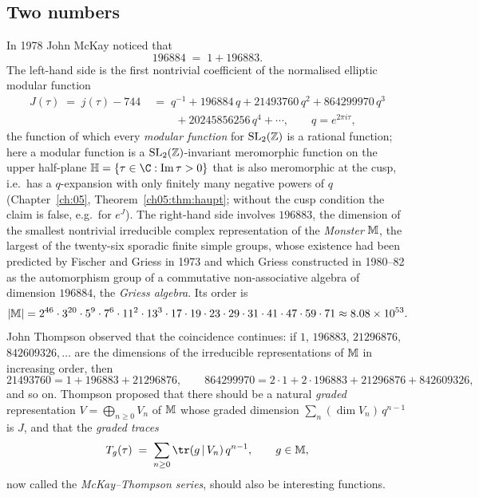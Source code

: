 \subsection{Two numbers}

In 1978 John McKay noticed that
\begin{equation}\label{ch16:eq:mckay}
  196884 \;=\; 1 + 196883 .
\end{equation}
The left-hand side is the first nontrivial coefficient of the normalised elliptic modular function
\begin{equation}\label{ch16:eq:J}
\begin{aligned}
  J(\tau) \;=\; j(\tau)-744 \;&=\; q^{-1} + 196884\,q + 21493760\,q^2 + 864299970\,q^3\\
  &\qquad + 20245856256\,q^4+\cdots,\qquad q=e^{2\pi i\tau},
\end{aligned}
\end{equation}
the function of which every \emph{modular function} for $\mathrm{SL}_2(\mathbb{Z})$ is a rational function; here a modular function is
a $\mathrm{SL}_2(\mathbb{Z})$-invariant meromorphic function on the upper half-plane $\chsixteenH=\{\tau\in\C:\operatorname{Im}\tau>0\}$
that is also meromorphic at the cusp, i.e.\ has a $q$-expansion with only finitely many negative powers of $q$
(Chapter~\ref{ch:05}, Theorem~\ref{ch05:thm:haupt}; without the cusp condition the claim is false, e.g.\ for
$e^{J}$).  The
right-hand side involves $196883$, the dimension of the smallest nontrivial irreducible complex representation of
the \emph{Monster} $\mathbb{M}$, the largest of the twenty-six sporadic finite simple groups, whose existence had been
predicted by Fischer and Griess in 1973 and which Griess constructed in 1980--82 as the automorphism group of a
commutative non-associative algebra of dimension $196884$, the \emph{Griess algebra}.  Its order is
\begin{equation*}
  |\mathbb{M}| = 2^{46}\cdot3^{20}\cdot5^{9}\cdot7^{6}\cdot11^{2}\cdot13^{3}\cdot17\cdot19\cdot23\cdot29\cdot31\cdot41
  \cdot47\cdot59\cdot71\approx 8.08\times10^{53}.
\end{equation*}
John Thompson observed that the coincidence continues: if $1$, $196883$, $21296876$, $842609326,\dots$ are the
dimensions of the irreducible representations of $\mathbb{M}$ in increasing order, then
\begin{equation*}
  21493760 = 1+196883+21296876,\qquad 864299970 = 2\cdot1+2\cdot196883+21296876+842609326,
\end{equation*}
and so on.  Thompson proposed that there should be a natural \emph{graded} representation
$V=\bigoplus_{n\ge0}V_n$ of $\mathbb{M}$ whose graded dimension $\sum_n(\dim V_n)\,q^{n-1}$ is $J$, and that the
\emph{graded traces}
\begin{equation}\label{ch16:eq:Tg-intro}
  T_g(\tau) \;=\; \sum_{n\ge0}\tr(g\,|\,V_n)\,q^{n-1}, \qquad g\in\chsixteenM,
\end{equation}
now called the \emph{McKay--Thompson series}, should also be interesting functions.


